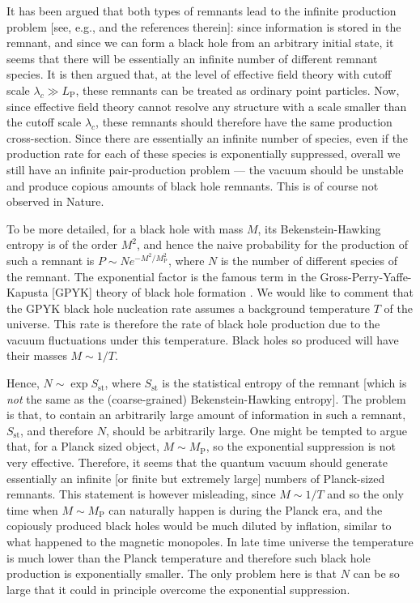 \documentclass[12pt]{article}
\newcommand{\2}{$^2$}
\newcommand{\3}{$^3$}
\newcommand{\4}{$_4$}
\newcommand{\5}{$_5$}
\begin{document}
It has been argued that both types of remnants lead to the infinite production problem [see, e.g., \cite{Giddings3} and the references therein]: since information is stored in the remnant, and since we can form a black hole from an arbitrary initial state, it seems that there will be essentially an infinite number of different remnant species. It is then argued that, at the level of effective field theory with cutoff scale $\lambda_c \gg L_{\text{P}}$, these remnants can be treated as ordinary point particles. Now, since effective field theory cannot resolve any structure with a scale smaller than the cutoff scale $\lambda_c$, these remnants should therefore have the same production cross-section. Since there are essentially an infinite number of species, even if the production rate for each of these species is exponentially suppressed, overall we still have an infinite pair-production problem --- the vacuum should be unstable and produce copious amounts of black hole remnants. This is of course not observed in Nature. 

To be more detailed, for a black hole with mass $M$, its Bekenstein-Hawking entropy is of the order $M^{2}$, and hence the naive probability for the production of such a remnant is $P \sim N e^{-M^{2}/M_{\text{P}}^2}$, where $N$ is the number of different species of the remnant. The exponential factor is the famous term in the Gross-Perry-Yaffe-Kapusta [GPYK] theory of black hole formation \cite{grossperryyaffe, kapusta}. We would like to comment that the GPYK black hole nucleation rate assumes a background temperature $T$ of the universe. This rate is therefore the rate of black hole production due to the vacuum fluctuations under this temperature. Black holes so produced will have their masses $M \sim 1/T$. 

Hence, $N \sim \exp S_{\mathrm{st}}$, where $S_{\mathrm{st}}$ is the statistical entropy of the remnant [which is \emph{not} the same as the (coarse-grained) Bekenstein-Hawking entropy]. The problem is that, to contain an arbitrarily large amount of information in such a remnant, $S_{\mathrm{st}}$, and therefore $N$, should be arbitrarily large. One might be tempted to argue that, for a Planck sized object, $M \sim M_{\text{P}}$, so the exponential suppression is not very effective. Therefore, it seems that the quantum vacuum should generate essentially an infinite [or finite but extremely large] numbers of Planck-sized remnants. This statement is however misleading, since $M \sim 1/T$ and so the only time when $M \sim M_{\text{P}}$ can naturally happen is during the Planck era, and the copiously produced black holes would be much diluted by inflation, similar to what happened to the magnetic monopoles. In late time universe the temperature is much lower than the Planck temperature and therefore such black hole production is exponentially smaller. The only problem here is that $N$ can be so large that it could in principle overcome the exponential suppression. 
\end{document}

